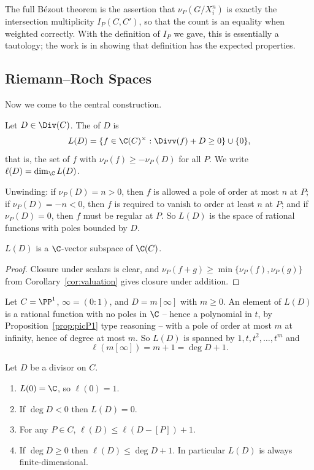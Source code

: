 The full B\'ezout theorem is the assertion that $\nu_P(G/X_i^n)$ is exactly the intersection multiplicity $I_P(C,C')$, so that the count is an equality when weighted correctly. With the definition of $I_P$ we gave, this is essentially a tautology; the work is in showing that definition has the expected properties.

\subsection{Riemann--Roch Spaces}

Now we come to the central construction.

\begin{definition}
	Let $D \in \Div(C)$. The  of $D$ is
	$$L(D) = \{f \in \C(C)^\times : \Divv(f) + D \geq 0\}\cup\{0\},$$
	that is, the set of $f$ with $\nu_P(f) \geq -\nu_P(D)$ for all $P$. We write $\ell(D) = \dim_\C L(D)$.
\end{definition}

Unwinding: if $\nu_P(D) = n > 0$, then $f$ is allowed a pole of order at most $n$ at $P$; if $\nu_P(D) = -n < 0$, then $f$ is required to vanish to order at least $n$ at $P$; and if $\nu_P(D) = 0$, then $f$ must be regular at $P$. So $L(D)$ is the space of rational functions with poles bounded by $D$.

\begin{proposition}
	$L(D)$ is a $\C$-vector subspace of $\C(C)$.
\end{proposition}

\begin{proof}
	Closure under scalars is clear, and $\nu_P(f+g)\geq\min\{\nu_P(f),\nu_P(g)\}$ from Corollary~\ref{cor:valuation} gives closure under addition.
\end{proof}

\begin{example}\label{ex:LDP1}
	Let $C = \PP^1$, $\infty = (0:1)$, and $D = m[\infty]$ with $m \geq 0$. An element of $L(D)$ is a rational function with no poles in $\C$ -- hence a polynomial in $t$, by Proposition~\ref{prop:picP1} type reasoning -- with a pole of order at most $m$ at infinity, hence of degree at most $m$. So $L(D)$ is spanned by $1,t,t^2,\dots,t^m$ and
	$$\ell(m[\infty]) = m+1 = \deg D + 1.$$
\end{example}

\begin{proposition}\label{prop:ellbounds}
	Let $D$ be a divisor on $C$.
	\begin{enumerate}[label=(\roman*)]
		\item $L(0) = \C$, so $\ell(0) = 1$.
		\item If $\deg D < 0$ then $L(D) = 0$.
		\item For any $P \in C$, $\ell(D) \leq \ell(D - [P]) + 1$.
		\item If $\deg D \geq 0$ then $\ell(D)\leq \deg D + 1$. In particular $L(D)$ is always finite-dimensional.
	\end{enumerate}
\end{proposition}

